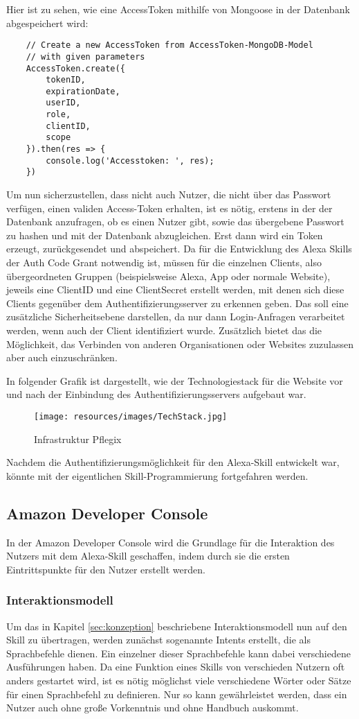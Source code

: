 Hier ist zu sehen, wie eine AccessToken mithilfe von Mongoose in der Datenbank abgespeichert wird:
\begin{lstlisting}
    // Create a new AccessToken from AccessToken-MongoDB-Model
    // with given parameters
    AccessToken.create({
        tokenID,
        expirationDate,
        userID,
        role,
        clientID,
        scope
    }).then(res => {
        console.log('Accesstoken: ', res);
    })
\end{lstlisting}
Um nun sicherzustellen, dass nicht auch Nutzer, die nicht über das Passwort verfügen, einen validen Access-Token erhalten, ist es nötig, erstens in der der Datenbank anzufragen, ob es einen Nutzer gibt, sowie das übergebene Passwort zu hashen und mit der Datenbank abzugleichen. Erst dann wird ein Token erzeugt, zurückgesendet und abspeichert. Da für die Entwicklung des Alexa Skills der Auth Code Grant notwendig ist, müssen für die einzelnen Clients, also übergeordneten Gruppen (beispielsweise Alexa, App oder normale Website), jeweils eine ClientID und eine ClientSecret erstellt werden, mit denen sich diese Clients gegenüber dem Authentifizierungsserver zu erkennen geben. Das soll eine zusätzliche Sicherheitsebene darstellen, da nur dann Login-Anfragen verarbeitet werden, wenn auch der Client identifiziert wurde. Zusätzlich bietet das die Möglichkeit, das Verbinden von anderen Organisationen oder Websites zuzulassen aber auch einzuschränken.

In folgender Grafik ist dargestellt, wie der Technologiestack für die Website vor und nach  der Einbindung des Authentifizierungsservers aufgebaut war.
\begin{figure} [H]
    \texttt{[image: resources/images/TechStack.jpg]}
    \caption{Infrastruktur Pflegix}
    \label{fig:techstack}
\end{figure}

Nachdem die Authentifizierungsmöglichkeit für den Alexa-Skill entwickelt war, könnte mit der eigentlichen Skill-Programmierung fortgefahren werden.

\subsection{Amazon Developer Console}
In der Amazon Developer Console wird die Grundlage für die Interaktion des Nutzers mit dem Alexa-Skill geschaffen, indem durch sie die ersten Eintrittspunkte für den Nutzer erstellt werden.

\subsubsection{Interaktionsmodell}
Um das in Kapitel \ref{sec:konzeption} beschriebene Interaktionsmodell nun auf den Skill zu übertragen, werden zunächst sogenannte Intents erstellt, die als Sprachbefehle dienen. Ein einzelner dieser Sprachbefehle kann dabei verschiedene Ausführungen haben. Da eine Funktion eines Skills von verschieden Nutzern oft anders gestartet wird, ist es nötig möglichst viele verschiedene Wörter oder Sätze für einen Sprachbefehl zu definieren. Nur so kann gewährleistet werden, dass ein Nutzer auch ohne große Vorkenntnis und ohne Handbuch auskommt.

